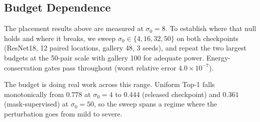 \documentclass[10pt,journal]{IEEEtran}
\begin{document}
\subsection{Budget Dependence}
\label{sec:placement_budget}

The placement results above are measured at $\sigma_0=8$. To establish where
that null holds and where it breaks, we sweep
$\sigma_0 \in \{4, 16, 32, 50\}$ on both checkpoints (ResNet18, 12 paired
locations, gallery 48, 3 seeds), and repeat the two largest budgets at the
50-pair scale with gallery 100 for adequate power. Energy-conservation gates
pass throughout (worst relative error $4.0\times10^{-7}$).

The budget is doing real work across this range. Uniform Top-1 falls
monotonically from $0.778$ at $\sigma_0=4$ to $0.444$ (released checkpoint)
and $0.361$ (mask-supervised) at $\sigma_0=50$, so the sweep spans a regime
where the perturbation goes from mild to severe.

\begin{table}[t]
\centering
\caption{Placement $\Delta$ versus uniform across budgets (ResNet18, 12 pairs, gallery 48). Positive is worse privacy. Edge placement reverses sign as the budget grows; the mechanism's own learned map never improves on uniform at any budget.}
\label{tab:placement_budget}
\end{table}
\end{document}
